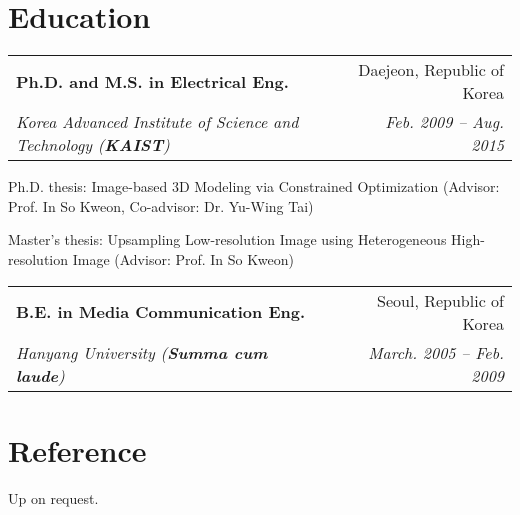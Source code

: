 \documentclass[letterpaper,11pt]{article}
\makeatletter
\newcommand{\resumeItem}[1]{
  \small{
  \item{#1 \vspace{-2pt}}
  }
}
\newcommand{\resumeSubheading}[4]{
  \vspace{-2pt}\item
    \begin{tabular*}{0.97\textwidth}[t]{l@{\extracolsep{\fill}}r}
      \textbf{#1} & #2 \\
      \textit{\small#3} & \textit{\small #4} \\
    \end{tabular*}\vspace{-7pt}
}
\newcommand{\resumeSubHeadingListStart}{\begin{itemize}[leftmargin=0.15in, label={}]}
\newcommand{\resumeSubHeadingListEnd}{\end{itemize}}
\newcommand{\resumeItemListStart}{\begin{itemize}}
\newcommand{\resumeItemListEnd}{\end{itemize}\vspace{-5pt}}
\makeatother
\begin{document}
\section{Education}
  \resumeSubHeadingListStart
    \resumeSubheading
      {Ph.D. and M.S. in Electrical Eng.}{Daejeon, Republic of Korea}
      {Korea Advanced Institute of Science and Technology \textnormal{(\textbf{KAIST})}}{Feb. 2009 -- Aug. 2015}
        \resumeItemListStart
        \resumeItem{Ph.D. thesis: Image-based 3D Modeling via Constrained Optimization (Advisor: Prof. In So Kweon, Co-advisor: Dr. Yu-Wing Tai)}
        \resumeItem{Master's thesis: Upsampling Low-resolution Image using Heterogeneous High-resolution Image (Advisor: Prof. In So Kweon)}
        \resumeItemListEnd
    \resumeSubheading
      {B.E. in Media Communication Eng.}{Seoul, Republic of Korea}
      {Hanyang University (\textbf{Summa cum laude})}{March. 2005 -- Feb. 2009}
  \resumeSubHeadingListEnd








\section{Reference}
  \resumeItemListStart
  \resumeItem{Up on request.}
  \resumeItemListEnd
  
\end{document}

